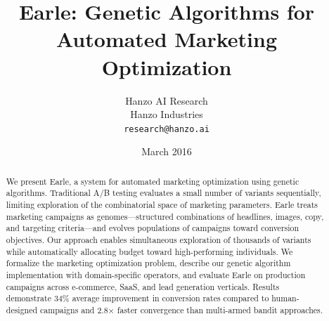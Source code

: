 \documentclass[11pt,twocolumn]{article}
\title{Earle: Genetic Algorithms for Automated Marketing Optimization}
\author{Hanzo AI Research\\
Hanzo Industries\\
\texttt{research@hanzo.ai}}
\date{March 2016}
\begin{document}
\hanzocoverpage

\begin{abstract}
We present Earle, a system for automated marketing optimization using genetic algorithms. Traditional A/B testing evaluates a small number of variants sequentially, limiting exploration of the combinatorial space of marketing parameters. Earle treats marketing campaigns as genomes—structured combinations of headlines, images, copy, and targeting criteria—and evolves populations of campaigns toward conversion objectives. Our approach enables simultaneous exploration of thousands of variants while automatically allocating budget toward high-performing individuals. We formalize the marketing optimization problem, describe our genetic algorithm implementation with domain-specific operators, and evaluate Earle on production campaigns across e-commerce, SaaS, and lead generation verticals. Results demonstrate 34\% average improvement in conversion rates compared to human-designed campaigns and 2.8$\times$ faster convergence than multi-armed bandit approaches.
\end{abstract}










\end{document}
